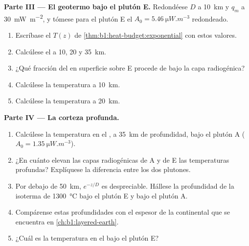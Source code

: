 \begin{problem}
\noindent\textbf{Parte III --- El geotermo bajo el plutón E.}
Redondéese $D$ a \qty{10}{km} y $q_m$ a \qty{30}{mW.m^{-2}}, y tómese para el plutón E el
$A_0 = \qty{5.46}{\micro W.m^{-3}}$ redondeado.
\begin{enumerate}[resume]
  \item Escríbase el  $T(z)$ de \cref{thm:b1:heat-budget:exponential} con
        estos valores.
  \item Calcúlese el  a 10, 20 y \qty{35}{km}.
  \item ¿Qué fracción del  en superficie sobre E procede de bajo la
        capa radiogénica?
  \item Calcúlese la temperatura a \qty{10}{km}.
  \item Calcúlese la temperatura a \qty{20}{km}.
\end{enumerate}

\noindent\textbf{Parte IV --- La corteza profunda.}
\begin{enumerate}[resume]
  \item Calcúlese la temperatura en el , a \qty{35}{km} de profundidad, bajo el plutón A
        ($A_0 = \qty{1.35}{\micro W.m^{-3}}$).
  \item ¿En cuánto elevan las capas radiogénicas de A y de E las temperaturas profundas?
        Explíquese la diferencia entre los dos plutones.
  \item Por debajo de \qty{50}{km}, $e^{-z/D}$ es despreciable. Hállese la profundidad de la
        isoterma de \qty{1300}{\degreeCelsius} bajo el plutón E y bajo el plutón A.
  \item Compárense estas profundidades con el espesor de la  continental
        que se encuentra en \cref{ch:b1:layered-earth}.
  \item ¿Cuál es la temperatura en el  bajo el plutón E?
\end{enumerate}
\end{problem}
